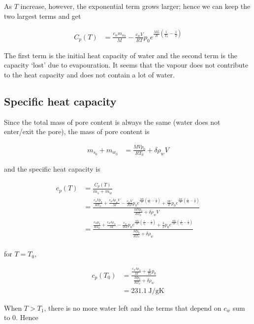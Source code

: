 \documentclass{article}
\begin{document}
As $T$ increase, however, the exponential term grows larger; hence we can keep the two largest terms and get

\begin{align*}
C_p(T) &= \frac{c_w m_{w_0}}{M} - \frac{c_w V}{RT}p_0 e^{\frac{ML}{R}\left(\frac{1}{T_0} - \frac{1}{T}\right)}
\end{align*}

The first term is the initial heat capacity of water and the second term is the capacity `lost' due to evapouration. It seems that the vapour does not contribute to the heat capacity and does not contain a lot of water.

\subsection{Specific heat capacity}

Since the total mass of pore content is always the same (water does not enter/exit the pore), the mass of pore content is

\begin{align*}
m_{s_0} + m_{w_0} &= \frac{MVp_0}{RT_0} + \delta \rho_w V
\end{align*}

and the specific heat capacity is

\begin{align*}
c_p(T) &= \frac{C_p(T)}{m_s + m_w} \\
&= \frac
{\frac{c_wVp_0}{RT_0} + \frac{c_w \delta \rho_w V}{M} - \frac{c_w V}{RT}p_0 e^{\frac{ML}{R}\left(\frac{1}{T_0} - \frac{1}{T}\right)} + \frac{3V}{T}p_0 e^{\frac{ML}{R}\left(\frac{1}{T_0} - \frac{1}{T}\right)}}
{\frac{MVp_0}{RT_0} + \delta \rho_w V} \\
&= \frac
{\frac{c_wp_0}{RT_0} + \frac{c_w \delta \rho_w}{M} - \frac{c_w}{RT}p_0 e^{\frac{ML}{R}\left(\frac{1}{T_0} - \frac{1}{T}\right)} + \frac{3}{T}p_0 e^{\frac{ML}{R}\left(\frac{1}{T_0} - \frac{1}{T}\right)}}
{\frac{Mp_0}{RT_0} + \delta \rho_w} \\
\end{align*}

for $T = T_0$,

\begin{align*}
c_p(T_0) &= \frac
{\frac{c_w \delta \rho_w}{M} + \frac{3}{T_0}p_0}
{\frac{Mp_0}{RT_0} + \delta \rho_w} \\
&= 231.1 \mathrm{\ J/gK}
\end{align*}

When $T > T_1$, there is no more water left and the terms that depend on $c_w$ sum to 0. Hence
\end{document}
